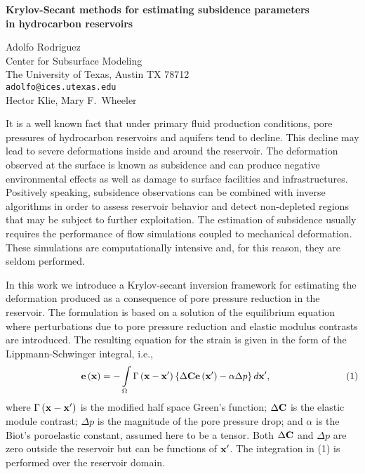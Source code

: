 \documentclass{report}
\begin{document}

\begin{center}
{\large
{\bf Krylov-Secant methods for estimating subsidence parameters \\
	in hydrocarbon reservoirs}}

	Adolfo Rodriguez \\
	Center for Subsurface Modeling \\
	The University of Texas,  Austin TX 78712 \\
	{\tt adolfo@ices.utexas.edu} \\
	Hector Klie, Mary F.~Wheeler
\end{center}
It is a well known fact that under primary fluid production
conditions, pore pressures of hydrocarbon reservoirs and
aquifers tend to decline. This decline may lead to severe
deformations inside and around the reservoir. The
deformation observed at the surface is known as subsidence
and can produce negative environmental effects as well as
damage to surface facilities and infrastructures. Positively
speaking, subsidence observations can be combined with
inverse algorithms in order to assess reservoir behavior and
detect non-depleted regions that may be subject to further
exploitation. The estimation of subsidence usually requires
the performance of flow simulations coupled to mechanical
deformation. These simulations are computationally intensive
and, for this reason, they are seldom performed.

In this
work we introduce a Krylov-secant inversion framework for
estimating the deformation produced as a consequence of pore
pressure reduction in the reservoir. The formulation is
based on a solution of the equilibrium equation where
perturbations due to pore pressure reduction and elastic
modulus contrasts are introduced. The resulting equation for
the strain is given in the form of the
Lippmann-Schwinger integral, i.e.,
$$
\qquad
\qquad
\qquad
\qquad
{\bf{e}}\left( {\bf{x}} \right)
= - \int\limits_\Omega
{\Gamma \left( {{\bf{x - x'}}} \right)}
\left\{ {\Delta {\bf{Ce}}\left( {{\bf{x'}}} \right)
- {\bf{\alpha }}\Delta p} \right\}d{\bf{x'}},
\qquad
\qquad
\qquad
\qquad
(1)
$$
where
$\Gamma \left( {{\bf{x - x'}}} \right)$
is the modified half space Green's function;
$\Delta\bf{C}$ is the elastic module contrast; $\Delta p$ is
the magnitude of the pore pressure drop; and $\alpha$ is the
Biot's poroelastic constant, assumed here to be a tensor.
Both $\Delta\bf{C}$ and $\Delta p$ are zero outside the
reservoir but can be functions of $\bf{x'}$. The integration
in (1) is performed over the reservoir domain.
\end{document}

